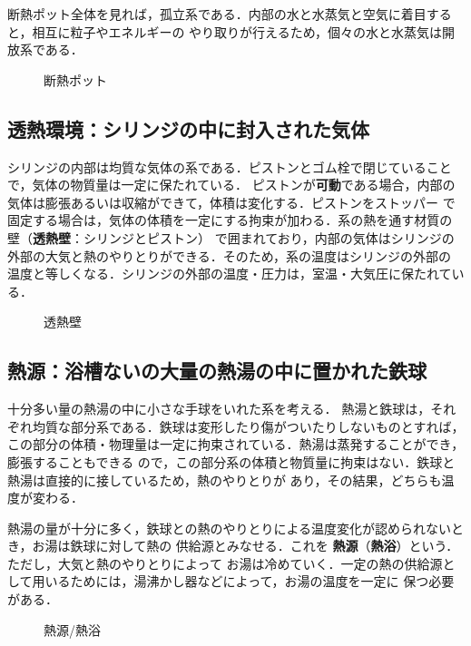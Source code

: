         断熱ポット全体を見れば，孤立系である．内部の水と水蒸気と空気に着目すると，相互に粒子やエネルギーの
        やり取りが行えるため，個々の水と水蒸気は開放系である．
        \begin{figure}[hbt]
            \begin{center}
                \caption{断熱ポット}
                \label{fig:neturikigaku_danetu_pot}
            \end{center}
        \end{figure}

    \subsection{透熱環境：シリンジの中に封入された気体}
        シリンジの内部は均質な気体の系である．ピストンとゴム栓で閉じていることで，気体の物質量は一定に保たれている．
        ピストンが\textbf{可動}である場合，内部の気体は膨張あるいは収縮ができて，体積は変化する．ピストンをストッパー
        で固定する場合は，気体の体積を一定にする拘束が加わる．系の熱を通す材質の壁（\textbf{透熱壁}：シリンジとピストン）
        で囲まれており，内部の気体はシリンジの外部の大気と熱のやりとりができる．そのため，系の温度はシリンジの外部の
        温度と等しくなる．シリンジの外部の温度・圧力は，室温・大気圧に保たれている．
        \begin{figure}[hbt]
            \begin{center}
                \caption{透熱壁}
                \label{fig:netsurikigaku_toukaheki}
            \end{center}
        \end{figure}

    \subsection{熱源：浴槽ないの大量の熱湯の中に置かれた鉄球}
        十分多い量の熱湯の中に小さな手球をいれた系を考える．
        熱湯と鉄球は，それぞれ均質な部分系である．鉄球は変形したり傷がついたりしないものとすれば，
        この部分の体積・物理量は一定に拘束されている．熱湯は蒸発することができ，膨張することもできる
        ので，この部分系の体積と物質量に拘束はない．鉄球と熱湯は直接的に接しているため，熱のやりとりが
        あり，その結果，どちらも温度が変わる．

        熱湯の量が十分に多く，鉄球との熱のやりとりによる温度変化が認められないとき，お湯は鉄球に対して熱の
        供給源とみなせる．これを \textbf{熱源}（\textbf{熱浴}）という．ただし，大気と熱のやりとりによって
        お湯は冷めていく．一定の熱の供給源として用いるためには，湯沸かし器などによって，お湯の温度を一定に
        保つ必要がある．
        \begin{figure}[hbt]
            \begin{center}
                \caption{熱源/熱浴}
                \label{fig:netsurikigaku_netugen}
            \end{center}
        \end{figure}


